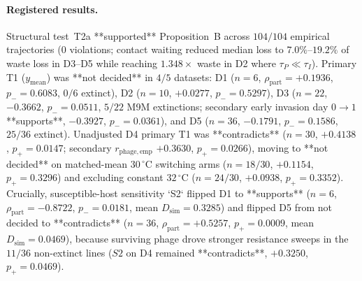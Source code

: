 \paragraph{Registered results.}
Structural test~T2a **supported** Proposition~B across $104/104$ empirical trajectories ($0$ violations; contact waiting reduced median loss to $7.0\%$--$19.2\%$ of waste loss in D3--D5 while reaching $1.348\times$ waste in D2 where $\tau_P \ll \tau_I$). Primary T1 ($y_{\mathrm{mean}}$) was **not decided** in $4/5$ datasets: D1 ($n = 6$, $\rho_{\mathrm{part}} = +0.1936$, $p_- = 0.6083$, $0/6$ extinct), D2 ($n = 10$, $+0.0277$, $p_- = 0.5297$), D3 ($n = 22$, $-0.3662$, $p_- = 0.0511$, $5/22$ M9M extinctions; secondary early invasion day $0 \to 1$ **supports**, $-0.3927$, $p_- = 0.0361$), and D5 ($n = 36$, $-0.1791$, $p_- = 0.1586$, $25/36$ extinct). Unadjusted D4 primary T1 was **contradicts** ($n = 30$, $+0.4138$, $p_+ = 0.0147$; secondary $r_{\mathrm{phage,emp}}$ $+0.3630$, $p_+ = 0.0266$), moving to **not decided** on matched-mean $30\,^{\circ}\mathrm{C}$ switching arms ($n = 18/30$, $+0.1154$, $p_+ = 0.3296$) and excluding constant $32\,^{\circ}\mathrm{C}$ ($n = 24/30$, $+0.0938$, $p_+ = 0.3352$). Crucially, susceptible-host sensitivity `S2` flipped D1 to **supports** ($n = 6$, $\rho_{\mathrm{part}} = -0.8722$, $p_- = 0.0181$, mean $D_{\mathrm{sim}} = 0.3285$) and flipped D5 from not decided to **contradicts** ($n = 36$, $\rho_{\mathrm{part}} = +0.5257$, $p_+ = 0.0009$, mean $D_{\mathrm{sim}} = 0.0469$), because surviving phage drove stronger resistance sweeps in the $11/36$ non-extinct lines ($S2$ on D4 remained **contradicts**, $+0.3250$, $p_+ = 0.0469$).

